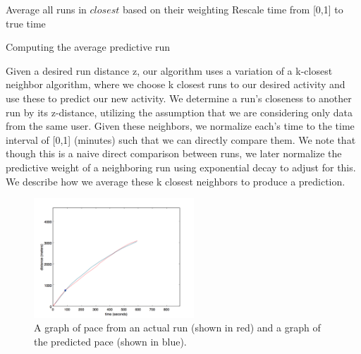 \documentclass[twoside]{article}
\begin{document}
\begin{multicols}{2}
\begin{algorithm}[H]
 Average all runs in $closest$ based on their weighting\linebreak\linebreak
 Rescale time from [0,1] to true time
 
 \caption{Computing the average predictive run}
\end{algorithm}
	
	Given a desired run distance z, our algorithm uses a variation of a k-closest neighbor algorithm, where we choose k closest runs to our desired activity and use these to predict our new activity.  We determine a run's closeness to another run by its z-distance, utilizing the assumption that we are considering only data from the same user.  Given these neighbors, we normalize each's time to the time interval of [0,1] (minutes) such that we can directly compare them. We note that though this is a naive direct comparison between runs, we later normalize the predictive weight of a neighboring run using exponential decay to adjust for this.  We describe how we average these k closest neighbors to produce a prediction.\\
	
\begin{figure}[H]
\begin{center}
\includegraphics[width=6cm]{overlap_run.png}
\caption{A graph of pace from an actual run (shown in red) and a graph of the predicted pace (shown in blue). }
\end{center}
\end{figure}
	

\end{multicols}
\end{document}
